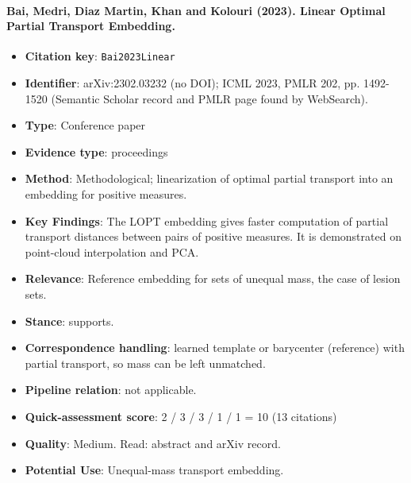 \documentclass[journal,onecolumn]{IEEEtran}
\begin{document}
\paragraph{Bai, Medri, Diaz Martin, Khan and Kolouri (2023). Linear Optimal Partial Transport Embedding.~\cite{Bai2023Linear}}\mbox{}

\begin{itemize}

\item{} \textbf{Citation key}: \texttt{Bai2023Linear}

\item{} \textbf{Identifier}: arXiv:2302.03232 (no DOI); ICML 2023, PMLR 202, pp. 1492-1520 (Semantic Scholar record and PMLR page found by WebSearch).

\item{} \textbf{Type}: Conference paper

\item{} \textbf{Evidence type}: proceedings

\item{} \textbf{Method}: Methodological; linearization of optimal partial transport into an embedding for positive measures.

\item{} \textbf{Key Findings}: The LOPT embedding gives faster computation of partial transport distances between pairs of positive measures. It is demonstrated on point-cloud interpolation and PCA.

\item{} \textbf{Relevance}: Reference embedding for sets of unequal mass, the case of lesion sets.

\item{} \textbf{Stance}: supports.

\item{} \textbf{Correspondence handling}: learned template or barycenter (reference) with partial transport, so mass can be left unmatched.

\item{} \textbf{Pipeline relation}: not applicable.

\item{} \textbf{Quick-assessment score}: 2 / 3 / 3 / 1 / 1 = 10 (13 citations)

\item{} \textbf{Quality}: Medium. Read: abstract and arXiv record.

\item{} \textbf{Potential Use}: Unequal-mass transport embedding.

\end{itemize}
\end{document}

